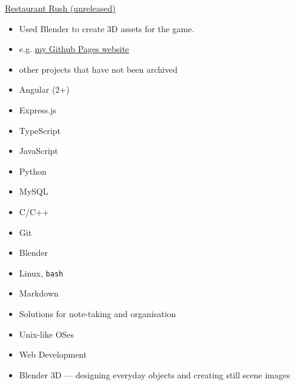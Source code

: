 \documentclass[10pt,a4paper,ragged2e,withhyper]{altacv}
\begin{document}
\begin{paracol}{2}
\divider

\small\href{https://github.com/Qarian/Restaurant-rush}{Restaurant Rush (unreleased)}
\smallskip

\begin{itemize}
    \item Used Blender to create 3D assets for the game.
\end{itemize}

\divider

\begin{itemize}
    \item e.g. \href{https://jerry-sky.github.io}{my Github Pages website}
    \item other projects that have not been archived
\end{itemize}

\switchcolumn


\begin{itemize}
\item Angular (2+)
\item Express.js
\item TypeScript
\item JavaScript
\item Python
\item MySQL
\item C/C++
\item Git
\item Blender
\item Linux, \texttt{bash}
\item Markdown
\end{itemize}


\begin{itemize}
  \item Solutions for note-taking and organisation
  \item Unix-like OSes
  \item Web Development
  \item Blender 3D — designing everyday objects and creating still scene images
\end{itemize}





\end{paracol}
\end{document}
